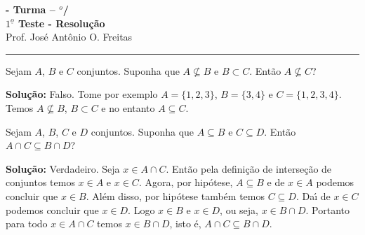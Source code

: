 \documentclass[12pt]{exam}
\begin{document}
\begin{center}
{\Large\bf \disciplina - Turma \turma -- \semestre$^{o}$/\ano} \\ \vspace{9pt} {\large\bf
$1^{\underline{o}}$ Teste - Resolu\c{c}\~ao}\\
\vspace{9pt} Prof. Jos{\'e} Ant{\^o}nio O. Freitas
\end{center}
\hrule

\vspace{.6cm}


\vspace{.6cm}

\questao Sejam $A$, $B$ e $C$ conjuntos. Suponha que $A \nsubseteq B$ e $B \subset C$. Ent\~ao $A \nsubseteq C$?

\noindent\textbf{Solu\c{c}\~ao:} Falso. Tome por exemplo $A = \{1,2,3\}$, $B = \{3,4\}$ e $C = \{1,2,3,4\}$. Temos $A \nsubseteq B$, $B \subset C$ e no entanto $A \subseteq C$.

\vspace{.5cm}

\questao Sejam $A$, $B$, $C$ e $D$ conjuntos. Suponha que $A \subseteq B$ e $C \subseteq D$. Ent\~ao $A \cap C \subseteq B \cap D$?

\noindent\textbf{Solu\c{c}\~ao:} Verdadeiro. Seja $x \in A \cap C$. Ent\~ao pela defini\c{c}\~ao de interse\c{c}\~ao de conjuntos temos $x \in A$ e $x \in C$. Agora, por hip\'otese, $A \subseteq B$ e de $x \in A$ podemos concluir que $x \in B$. Al\'em disso, por hip\'otese tamb\'em temos $C \subseteq D$. Da{\'\i} de $x \in C$ podemos concluir que $x \in D$. Logo $x \in B$ e $x \in D$, ou seja, $x \in B \cap D$. Portanto para todo $x \in A \cap C$ temos $x \in B \cap D$, isto \'e, $A \cap C \subseteq B \cap D$.
\end{document}
